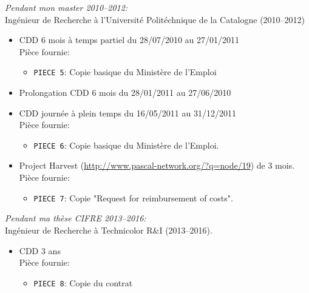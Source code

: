 \newpage
\vspace{1cm}
\textit{Pendant mon master 2010--2012:}\\
Ingénieur de Recherche à l'Université Politéchnique de la Catalogne (2010--2012)\\
\begin{itemize}
	\item CDD 6 mois à temps partiel du 28/07/2010 au 27/01/2011\\
	Pièce fournie:
	\begin{itemize}
		\item \texttt{PIECE 5}: Copie basique du Ministère de l'Emploi
	\end{itemize}
	\item Prolongation CDD 6 mois du 28/01/2011 au 27/06/2010\\
	\item CDD journée à plein temps du 16/05/2011 au 31/12/2011\\
	Pièce fournie:
	\begin{itemize}
		\item \texttt{PIECE 6}: Copie basique du Ministère de l'Emploi.
	\end{itemize}
	\item Project Harvest (\url{http://www.pascal-network.org/?q=node/19}) de 3 mois.\\
	Pièce fournie:
	\begin{itemize}
		\item \texttt{PIECE 7}: Copie "Request for reimbursement of costs".
	\end{itemize}
\end{itemize}

\vspace{1cm}
\textit{Pendant ma thèse CIFRE 2013--2016:}\\
Ingénieur de Recherche à Technicolor R\&I (2013--2016).\\
\begin{itemize}
	\item CDD 3 ans\\
	Pièce fournie:
	\begin{itemize}
		\item \texttt{PIECE 8}: Copie du contrat
	\end{itemize}
\end{itemize}

\vspace{1cm}

\makeletterclosing

\clearpage

